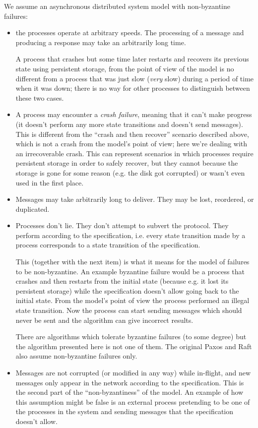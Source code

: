 \documentclass[12pt,a4paper,en]{pracamgr}
\newcommand{\ti}[1]{\textit{#1}}
\begin{document}
We assume an asynchronous distributed system model with non-byzantine failures:
\begin{itemize}
    \item the processes operate at arbitrary speeds. The processing of a message and producing a response may take an arbitrarily long time.

        A process that crashes but some time later restarts and recovers its previous state using persistent storage, from the point of view of the model is no different from a process that was just slow (\ti{very} slow) during a period of time when it was down; there is no way for other processes to distinguish between these two cases.
    \item A process may encounter a \ti{crash failure}, meaning that it can't make progress (it doesn't perform any more state transitions and doesn't send messages). This is different from the ``crash and then recover'' scenario described above, which is not a crash from the model's point of view; here we're dealing with an irrecoverable crash. This can represent scenarios in which processes require persistent storage in order to safely recover, but they cannot because the storage is gone for some reason (e.g. the disk got corrupted) or wasn't even used in the first place.
    \item Messages may take arbitrarily long to deliver. They may be lost, reordered, or duplicated.
    \item Processes don't lie. They don't attempt to subvert the protocol. They perform according to the specification, i.e. every state transition made by a process corresponds to a state transition of the specification.

        This (together with the next item) is what it means for the model of failures to be non-byzantine. An example byzantine failure would be a process that crashes and then restarts from the initial state (because e.g. it lost its persistent storage) while the specification doesn't allow going back to the initial state. From the model's point of view the process performed an illegal state transition. Now the process can start sending messages which should never be sent and the algorithm can give incorrect results.

        There are algorithms which tolerate byzantine failures (to some degree) but the algorithm presented here is not one of them. The original Paxos and Raft also assume non-byzantine failures only.
    \item Messages are not corrupted (or modified in any way) while in-flight, and new messages only appear in the network according to the specification. This is the second part of the ``non-byzantiness'' of the model. An example of how this assumption might be false is an external process pretending to be one of the processes in the system and sending messages that the specification doesn't allow.
\end{itemize}
\end{document}
